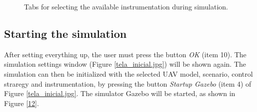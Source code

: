 \begin{figure}
	\hfill
	\hfill
	\hfill
	\caption{Tabs for selecting the available instrumentation during simulation.}
	\label{6}
\end{figure}

\subsection{Starting the simulation}

After setting everything up, the user must press the button \textit{OK} (item 10). The simulation settings window (Figure \ref{tela_inicial.jpg}) will be shown again. The simulation can then be initialized with the selected UAV model, scenario, control straregy and instrumentation, by pressing the button \textit{Startup Gazebo} (item 4) of Figure \ref{tela_inicial.jpg}. The simulator Gazebo will be started, as shown in Figure \ref{12}. 

